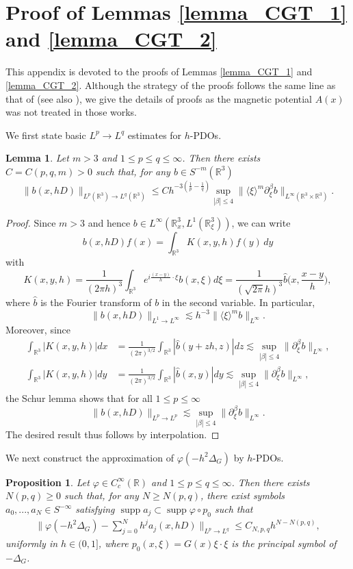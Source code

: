 \documentclass[10pt%
]{amsart}
\numberwithin{equation}{section}
\newcommand{\R}{\mathbb{R}}
\newtheorem{lemma}[theorem]{Lemma}
\newtheorem{proposition}[theorem]{Proposition}
\theoremstyle{definition}
\def\<{{\langle}}
\def\>{{\rangle}}
\def\supp{\mathop{\mathrm{supp}}\nolimits}
\begin{document}
\appendix
\section{Proof of Lemmas \ref{lemma_CGT_1} and \ref{lemma_CGT_2}}\label{appendix_semiclassical}

This appendix is devoted to the proofs of Lemmas \ref{lemma_CGT_1} and \ref{lemma_CGT_2}. Although the strategy of the proofs follows the same line as that of \cite{BGT} (see also \cite{Bouclet}), we give the details of proofs as the magnetic potential $A(x)$ was not treated in those works. 

We first state basic $L^p\to L^q$ estimates for $h$-PDOs. 

\begin{lemma}
	\label{lemma_appendix_1}
	Let $m>3$ and $1\le p\le q\le \infty$. Then there exists $C=C(p,q,m)>0$ such that, for any $b\in S^{-m}(\R^3)$
	$$
	\|b(x,hD)\|_{L^p(\R^3)\to L^q(\R^3)}\le C h^{-3(\frac1p-\frac1q)}\sup_{|\beta|\le 4}\|\<\xi\>^m\partial_\xi^\beta b\|_{L^\infty(\R^3\times\R^3)}. 
	$$
\end{lemma}

\begin{proof}
	Since $m>3$ and hence $b\in L^\infty(\R^3_x,L^1(\R^3_\xi))$, we can write
	$$
	b(x, hD)f(x)=\int_{\R^3}K(x,y,h)f(y)\,dy
	$$
	with
	$$
	K(x,y,h)=\frac{1}{(2\pi h)^3}\int_{\R^3}e^{i\frac{(x-y)}{h}\cdot\xi}b(x,\xi)d\xi=\frac{1}{(\sqrt{2\pi} h)^3}\hat{b}\Big(x,\frac{x-y}{h}\Big),
	$$
	where $\hat b$ is the Fourier transform of $b$ in  the second variable. In particular,
	$$
	\|b(x,hD)\|_{L^1\to L^\infty}\lesssim h^{-3}\|\<\xi\>^m b\|_{L^\infty}.
	$$
	Moreover, since
	\begin{align*}
		\int_{\R^3}|K(x,y,h)|dx&=\frac{1}{(2\pi)^{3/2}}\int_{\R^3}|\hat b(y+zh,z)|dz\lesssim \sup_{|\beta|\le4}\|\partial_\xi^\beta b\|_{L^\infty},\\
		\int_{\R^3}|K(x,y,h)|dy&=\frac{1}{(2\pi)^{3/2}}\int_{\R^3}|\hat b(x,y)|dy\lesssim \sup_{|\beta|\le4}\|\partial_\xi^\beta b\|_{L^\infty},
	\end{align*}
	the Schur lemma shows that for all $1\le p\le \infty$ $$\|b(x,hD)\|_{L^p\to L^p}\lesssim \sup_{|\beta|\le4}\|\partial_\xi^\beta b\|_{L^\infty}.$$
	The desired result thus follows by interpolation. 
\end{proof}


We next construct the approximation of $\varphi(-h^2\Delta_G)$ by $h$-PDOs.

\begin{proposition}
	\label{proposition_appendix_2}
	Let $\varphi\in C_c^\infty(\R)$ and $1\le p\le q\le \infty$. Then there exists $N(p,q)\ge0$ such that, for any $N\ge N(p,q)$, there exist symbols $a_0,...,a_N\in S^{-\infty}$ satisfying $\supp a_j\subset \supp \varphi\circ p_0$ such that
	\begin{align}
		\label{proposition_appendix_2_1}
		\Big\|\varphi(-h^2\Delta_G)-\sum_{j=0}^Nh^j a_{j}(x,hD)\Big\|_{L^p\to L^q}\le C_{N,p,q}h^{N-N(p,q)},
	\end{align}
	uniformly in $h\in (0,1]$, where $p_0(x,\xi)=G(x)\xi\cdot\xi$ is the principal symbol of $-\Delta_G$. 
\end{proposition}
\end{document}

